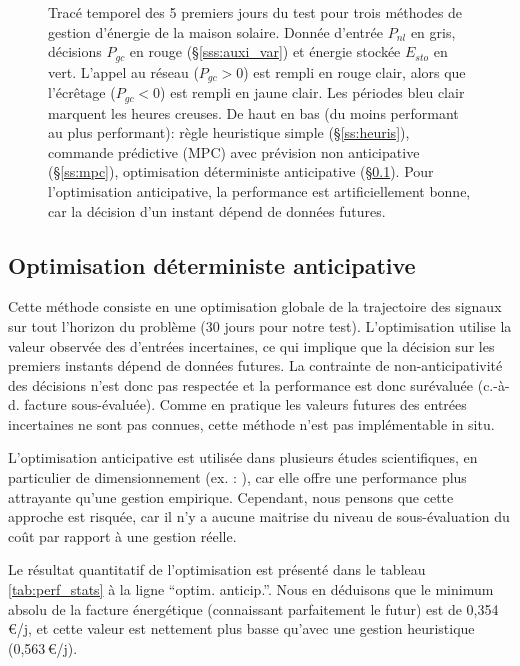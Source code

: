 \documentclass[a4paper,10pt,twocolumn]{article}
\begin{document}
\begin{figure}
  \caption{Tracé temporel des 5 premiers jours du test pour trois méthodes
  de gestion d'énergie de la maison solaire.
  Donnée d'entrée $P_{nl}$ en gris, décisions $P_{gc}$ en rouge (§\ref{sss:auxi_var})
  et énergie stockée $E_{sto}$ en vert.
  L'appel au réseau ($P_{gc}>0$) est rempli en rouge clair,
  alors que l'écrêtage ($P_{gc}<0$) est rempli en jaune clair.
  Les périodes bleu clair marquent les heures creuses.
  De haut en bas (du moins performant au plus performant):
  règle heuristique simple (§\ref{ss:heuris}),
  commande prédictive (MPC) avec prévision non anticipative (§\ref{ss:mpc}),
  optimisation déterministe anticipative (§\ref{ss:anticip}).
  Pour l'optimisation anticipative, la performance est artificiellement bonne,
  car la décision d'un instant dépend de données futures.
  }
  \label{fig:temporel}
\end{figure}

\subsection{Optimisation déterministe anticipative}
\label{ss:anticip}

Cette méthode consiste en une optimisation globale de la trajectoire des signaux
sur tout l'horizon du problème (30 jours pour notre test).
L'optimisation utilise la valeur observée des d'entrées incertaines,
ce qui implique que la décision sur les premiers instants dépend
de données futures.
La contrainte de non-anticipativité des décisions n'est donc pas respectée 
et la performance est donc surévaluée (c.-à-d. facture sous-évaluée).
Comme en pratique les valeurs futures des entrées incertaines ne sont pas connues,
cette méthode n'est pas implémentable in situ.

L'optimisation anticipative est utilisée dans plusieurs études scientifiques,
en particulier de dimensionnement (ex. : \cite{Rigo-Mariani:2017:ToSG}),
car elle offre une performance plus attrayante qu'une gestion empirique.
Cependant, nous pensons que cette approche est risquée, car il n'y a aucune maitrise
du niveau de sous-évaluation du coût par rapport à une gestion réelle.

Le résultat quantitatif de l'optimisation est présenté dans le tableau \ref{tab:perf_stats}
à la ligne ``optim. anticip.''.
Nous en déduisons que le minimum absolu de la facture énergétique 
(connaissant parfaitement le futur) est de 0,354\,€/j,
et cette valeur est nettement plus basse qu'avec une gestion heuristique (0,563\,€/j).
\end{document}
